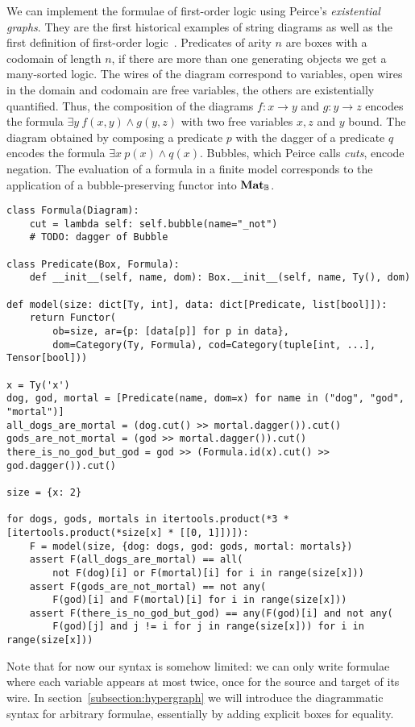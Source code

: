 \begin{example}\label{example:monoidal-formula}
We can implement the formulae of first-order logic using Peirce's \emph{existential graphs}.
They are the first historical examples of string diagrams as well as the first definition of first-order logic~\cite{BradyTrimble98,BradyTrimble00,MelliesZeilberger16,HaydonSobocinski20}.
Predicates of arity $n$ are boxes with a codomain of length $n$, if there are more than one generating objects we get a many-sorted logic.
The wires of the diagram correspond to variables, open wires in the domain and codomain are free variables, the others are existentially quantified.
Thus, the composition of the diagrams $f : x \to y$ and $g : y \to z$ encodes the formula $\exists y \ f(x, y) \land g(y, z)$ with two free variables $x, z$ and $y$ bound.
The diagram obtained by composing a predicate $p$ with the dagger of a predicate $q$ encodes the formula $\exists x \ p(x) \land q(x)$.
Bubbles, which Peirce calls \emph{cuts}, encode negation.
The evaluation of a formula in a finite model corresponds to the application of a bubble-preserving functor into $\mathbf{Mat}_{\mathbb{B}}$.

\begin{verbatim}
class Formula(Diagram):
    cut = lambda self: self.bubble(name="_not")
    # TODO: dagger of Bubble

class Predicate(Box, Formula):
    def __init__(self, name, dom): Box.__init__(self, name, Ty(), dom)

def model(size: dict[Ty, int], data: dict[Predicate, list[bool]]):
    return Functor(
        ob=size, ar={p: [data[p]] for p in data},
        dom=Category(Ty, Formula), cod=Category(tuple[int, ...], Tensor[bool]))

x = Ty('x')
dog, god, mortal = [Predicate(name, dom=x) for name in ("dog", "god", "mortal")]
all_dogs_are_mortal = (dog.cut() >> mortal.dagger()).cut()
gods_are_not_mortal = (god >> mortal.dagger()).cut()
there_is_no_god_but_god = god >> (Formula.id(x).cut() >> god.dagger()).cut()

size = {x: 2}

for dogs, gods, mortals in itertools.product(*3 * [itertools.product(*size[x] * [[0, 1]])]):
    F = model(size, {dog: dogs, god: gods, mortal: mortals})
    assert F(all_dogs_are_mortal) == all(
        not F(dog)[i] or F(mortal)[i] for i in range(size[x]))
    assert F(gods_are_not_mortal) == not any(
        F(god)[i] and F(mortal)[i] for i in range(size[x]))
    assert F(there_is_no_god_but_god) == any(F(god)[i] and not any(
        F(god)[j] and j != i for j in range(size[x])) for i in range(size[x]))
\end{verbatim}

Note that for now our syntax is somehow limited: we can only write formulae where each variable appears at most twice, once for the source and target of its wire.
In section~\ref{subsection:hypergraph} we will introduce the diagrammatic syntax for arbitrary formulae, essentially by adding explicit boxes for equality.
\end{example}

